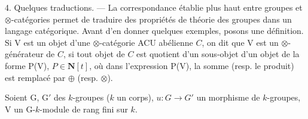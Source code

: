 4. Quelques traductions. --- La correspondance établie plus haut
entre groupes et $\otimes$-catégories permet de traduire des propriétés de théorie
des groupes dans un langage catégorique. Avant d'en donner quelques
exemples, posons une définition. Si V est un objet d'une $\otimes$-catégorie ACU
abélienne $C$, on dit que V est un $\otimes$-générateur de $C$, si tout objet de $C$
est quotient d'un sous-objet d'un objet de la forme P(V), $P \in \mathbf{N}[t]$, où
dans l'expression P(V), la somme (resp. le produit) est remplacé par $\oplus$
(resp. $\otimes$).

Soient G, G$'$ des $k$-groupes ($k$ un corps), $u : G \to G'$ un morphisme
de $k$-groupes, V un G-$k$-module de rang fini sur $k$.

